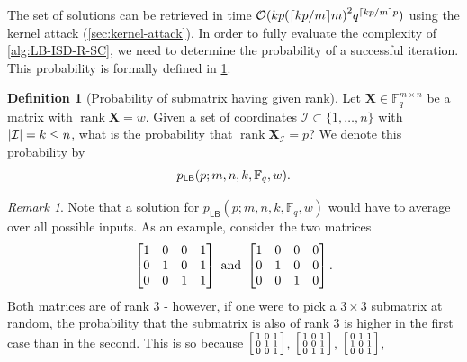 \documentclass[version=last, paper=A4, parskip=half, oneside,%
toc=bibliography, toc=listof, listof=leveldown]{scrbook}
\theoremstyle{plain}
\theoremstyle{definition}
\newtheorem{definition}{Definition}
\theoremstyle{remark}
\newtheorem*{remark}{Remark}
\newcommand*{\mat}{\symbf}
\DeclareMathOperator{\rank}{rank}
\newcommand*{\FF}{\ensuremath{\mathbb{F}}}
\DeclarePairedDelimiter{\ceil}{\lceil}{\rceil}
\DeclarePairedDelimiter{\card}{\lvert}{\rvert}
\newcommand*{\LB}{\ensuremath{\mathsf{LB}}}
\begin{document}
The set of solutions can be retrieved in time
\(\mathcal{O}(k p {(\ceil{k p / {m}} m)}^2 q^{\ceil{k p / {m}} p})\) using the
kernel attack (\cref{sec:kernel-attack}).  In order to fully evaluate the
complexity of \cref{alg:LB-ISD-R-SC}, we need to determine the probability of a
successful iteration.  This probability is formally defined in
\cref{def:submatrix-rank-distribution}.

\begin{definition}[Probability of submatrix having given
  rank]\label{def:submatrix-rank-distribution}
  Let \(\mat{X} \in \FF_q^{m \times n}\) be a matrix with \(\rank \mat{X} = w\).
  Given a set of coordinates \(\mathcal{I} \subset \{1, \ldots, n\}\) with
  \(\card{\mathcal{I}} = k \le n\), what is the probability that
  \(\rank \mat{X}_{\mathcal{I}} = p\)?  We denote this probability by
  \[
    p_{\LB}(p; m, n, k, \FF_q, w)\text.
  \]
  \begin{remark}
    Note that a solution for \(p_{\LB}(p; m, n, k, \FF_q, w)\) would have to
    average over all possible inputs.  As an example, consider the two matrices
    \[
      \begin{bmatrix}
        1 & 0 & 0 & 1 \\
        0 & 1 & 0 & 1 \\
        0 & 0 & 1 & 1
      \end{bmatrix}\ \text{and}\
      \begin{bmatrix}
        1 & 0 & 0 & 0 \\
        0 & 1 & 0 & 0 \\
        0 & 0 & 1 & 0
      \end{bmatrix}\text.
    \]
    Both matrices are of rank \(3\) \--{} however, if one were to pick a
    \(3 \times 3\) submatrix at random, the probability that the submatrix is
    also of rank \(3\) is higher in the first case than in the second.  This is
    so because
    \(\begin{bsmallmatrix} 1 & 0 & 1 \\ 0 & 1 & 1 \\ 0 & 0 & 1 \end{bsmallmatrix}\),
    \(\begin{bsmallmatrix} 1 & 0 & 1 \\ 0 & 0 & 1 \\ 0 & 1 & 1 \end{bsmallmatrix}\),
    \(\begin{bsmallmatrix} 0 & 1 & 1 \\ 1 & 0 & 1 \\ 0 & 0 & 1 \end{bsmallmatrix}\),

\end{remark}
\end{definition}
\end{document}
